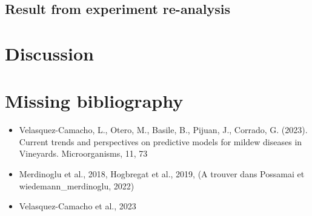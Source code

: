 \documentclass[english]{article}
\begin{document}
\subsection{Result from experiment re-analysis}

\section{Discussion}

\section{Missing bibliography}

\begin{itemize}
	\item Velasquez-Camacho, L., Otero, M., Basile, B., Pijuan, J., Corrado, G. (2023). Current trends and perspectives on predictive models for mildew diseases in Vineyards. Microorganisms, 11, 73
	\item Merdinoglu et al., 2018, Hogbregat et al., 2019, (A trouver dans Possamai et wiedemann\_merdinoglu, 2022)
	\item Velasquez-Camacho et al., 2023
\end{itemize}




\printbibliography
\end{document}
